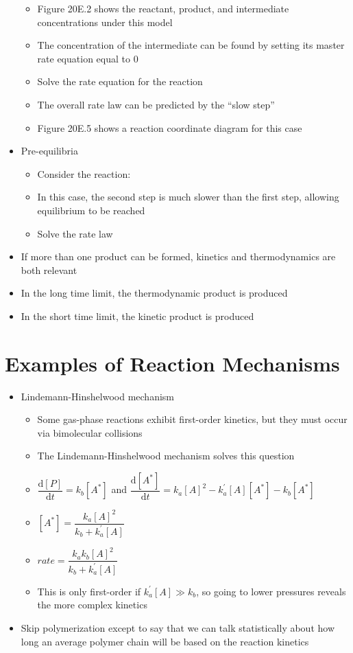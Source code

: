 \documentclass[12pt, openany, letterpaper]{memoir}
\begin{document}
\begin{itemize}
\begin{itemize}
		\item Figure 20E.2 shows the reactant, product, and intermediate concentrations under this model
		\item The concentration of the intermediate can be found by setting its master rate equation equal to 0
		\item Solve the rate equation for the reaction 
		\item The overall rate law can be predicted by the “slow step”
		\item Figure 20E.5 shows a reaction coordinate diagram for this case
	\end{itemize}
	\item Pre-equilibria
	\begin{itemize}
		\item Consider the reaction: 
		\item In this case, the second step is much slower than the first step, allowing equilibrium to be reached
		\item Solve the rate law
	\end{itemize}
	\item If more than one product can be formed, kinetics and thermodynamics are both relevant
	\item In the long time limit, the thermodynamic product is produced
	\item In the short time limit, the kinetic product is produced
\end{itemize}

\section{Examples of Reaction Mechanisms}
\begin{itemize}
	\item Lindemann-Hinshelwood mechanism
	\begin{itemize}
		\item Some gas-phase reactions exhibit first-order kinetics, but they must occur via bimolecular collisions
		\item The Lindemann-Hinshelwood mechanism solves this question
		
		
		
		\item $\dfrac{\mathrm{d}[P]}{\mathrm{d}t} = k_b[A^*]$ and  $\dfrac{\mathrm{d}[A^*]}{\mathrm{d}t} = k_a[A]^2-k^\prime_a[A][A^*]-k_b[A^*]$
		\item $[A^*]=\dfrac{k_a[A]^2}{k_b+k^\prime_a[A]}$
		\item $rate = \dfrac{k_ak_b[A]^2}{k_b+k^\prime_a[A]}$
		\item This is only first-order if $k_a^\prime[A]\gg k_b$, so going to lower pressures reveals the more complex kinetics
	\end{itemize}
	\item Skip polymerization except to say that we can talk statistically about how long an average polymer chain will be based on the reaction kinetics
\end{itemize}
\end{document}
